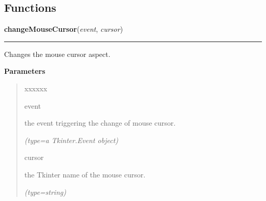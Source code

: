 
  \subsection{Functions}

    \label{nMOLDYN:GUI:Widgets:changeMouseCursor}

    \vspace{0.5ex}

\hspace{.8\funcindent}\begin{boxedminipage}{\funcwidth}

    \raggedright \textbf{changeMouseCursor}(\textit{event}, \textit{cursor})

    \vspace{-1.5ex}

    \rule{\textwidth}{0.5\fboxrule}
\setlength{\parskip}{2ex}
    Changes the mouse cursor aspect.

\setlength{\parskip}{1ex}
      \textbf{Parameters}
      \vspace{-1ex}

      \begin{quote}
        \begin{Ventry}{xxxxxx}

          \item[event]

          the event triggering the change of mouse cursor.

            {\it (type=a Tkinter.Event object)}

          \item[cursor]

          the Tkinter name of the mouse cursor.

            {\it (type=string)}

        \end{Ventry}

      \end{quote}

    \end{boxedminipage}

    \label{nMOLDYN:GUI:Widgets:loadHelpTree}

